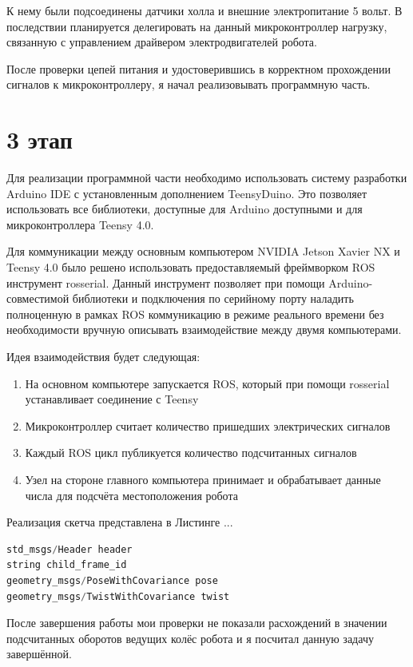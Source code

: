 \documentclass[12pt,a4paper]{scrartcl}
\begin{document}
			К нему были подсоединены датчики холла и внешние электропитание 5 вольт. В последствии планируется делегировать на данный микроконтроллер нагрузку, связанную с управлением драйвером электродвигателей робота.
			
			После проверки цепей питания и удостоверившись в корректном прохождении сигналов к микроконтроллеру, я начал реализовывать программную часть.
			
		\section*{3 этап}
			Для реализации программной части необходимо использовать систему разработки Arduino IDE с установленным дополнением TeensyDuino. Это позволяет использовать все библиотеки, доступные для Arduino доступными и для микроконтроллера Teensy 4.0. 
			
			Для коммуникации между основным компьютером NVIDIA Jetson Xavier NX и Teensy 4.0 было решено использовать предоставляемый фреймворком ROS инструмент rosserial. Данный инструмент позволяет при помощи Arduino-совместимой библиотеки и подключения по серийному порту наладить полноценную в рамках ROS коммуникацию в режиме реального времени без необходимости вручную описывать взаимодействие между двумя компьютерами.
			
			Идея взаимодействия будет следующая:
			\begin{enumerate}
				\item На основном компьютере запускается ROS, который при помощи rosserial устанавливает соединение с Teensy
				\item Микроконтроллер считает количество пришедших электрических сигналов
				\item Каждый ROS цикл публикуется количество подсчитанных сигналов
				\item Узел на стороне главного компьютера принимает и обрабатывает данные числа для подсчёта местоположения робота
			\end{enumerate}
			
			Реализация скетча представлена в Листинге ...
			
			\begin{lstlisting}[language=C,caption={Формат сообщения nav\_msgs/Odometry},label={lst:OdometryMsg}]
std_msgs/Header header
string child_frame_id
geometry_msgs/PoseWithCovariance pose
geometry_msgs/TwistWithCovariance twist
			\end{lstlisting}	
			
			После завершения работы мои проверки не показали расхождений в значении подсчитанных оборотов ведущих колёс робота и я посчитал данную задачу завершённой.
			
		
\end{document}
